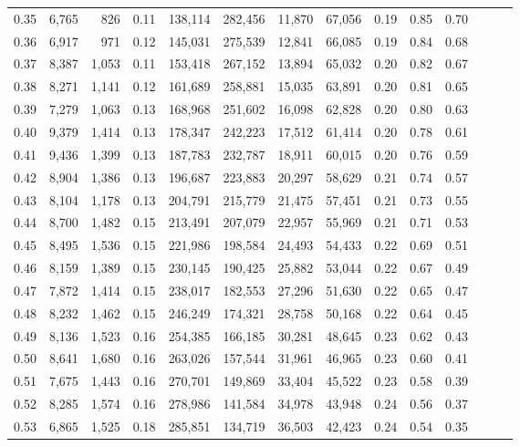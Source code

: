 \begin{tabular}{rrrrrrrrrrrrrr}
0.35 &  6,765 &    826 &  0.11 &  138,114 &  282,456 &  11,870 &  67,056 &  0.19 &  0.85 &      0.70 \\
0.36 &  6,917 &    971 &  0.12 &  145,031 &  275,539 &  12,841 &  66,085 &  0.19 &  0.84 &      0.68 \\
0.37 &  8,387 &  1,053 &  0.11 &  153,418 &  267,152 &  13,894 &  65,032 &  0.20 &  0.82 &      0.67 \\
0.38 &  8,271 &  1,141 &  0.12 &  161,689 &  258,881 &  15,035 &  63,891 &  0.20 &  0.81 &      0.65 \\
0.39 &  7,279 &  1,063 &  0.13 &  168,968 &  251,602 &  16,098 &  62,828 &  0.20 &  0.80 &      0.63 \\
0.40 &  9,379 &  1,414 &  0.13 &  178,347 &  242,223 &  17,512 &  61,414 &  0.20 &  0.78 &      0.61 \\
0.41 &  9,436 &  1,399 &  0.13 &  187,783 &  232,787 &  18,911 &  60,015 &  0.20 &  0.76 &      0.59 \\
0.42 &  8,904 &  1,386 &  0.13 &  196,687 &  223,883 &  20,297 &  58,629 &  0.21 &  0.74 &      0.57 \\
0.43 &  8,104 &  1,178 &  0.13 &  204,791 &  215,779 &  21,475 &  57,451 &  0.21 &  0.73 &      0.55 \\
0.44 &  8,700 &  1,482 &  0.15 &  213,491 &  207,079 &  22,957 &  55,969 &  0.21 &  0.71 &      0.53 \\
0.45 &  8,495 &  1,536 &  0.15 &  221,986 &  198,584 &  24,493 &  54,433 &  0.22 &  0.69 &      0.51 \\
0.46 &  8,159 &  1,389 &  0.15 &  230,145 &  190,425 &  25,882 &  53,044 &  0.22 &  0.67 &      0.49 \\
0.47 &  7,872 &  1,414 &  0.15 &  238,017 &  182,553 &  27,296 &  51,630 &  0.22 &  0.65 &      0.47 \\
0.48 &  8,232 &  1,462 &  0.15 &  246,249 &  174,321 &  28,758 &  50,168 &  0.22 &  0.64 &      0.45 \\
0.49 &  8,136 &  1,523 &  0.16 &  254,385 &  166,185 &  30,281 &  48,645 &  0.23 &  0.62 &      0.43 \\
0.50 &  8,641 &  1,680 &  0.16 &  263,026 &  157,544 &  31,961 &  46,965 &  0.23 &  0.60 &      0.41 \\
0.51 &  7,675 &  1,443 &  0.16 &  270,701 &  149,869 &  33,404 &  45,522 &  0.23 &  0.58 &      0.39 \\
0.52 &  8,285 &  1,574 &  0.16 &  278,986 &  141,584 &  34,978 &  43,948 &  0.24 &  0.56 &      0.37 \\
0.53 &  6,865 &  1,525 &  0.18 &  285,851 &  134,719 &  36,503 &  42,423 &  0.24 &  0.54 &      0.35 \\

\end{tabular}
